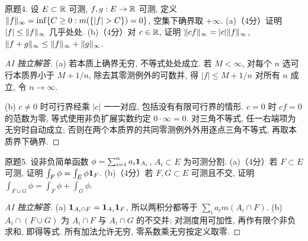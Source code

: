 \begin{exercise}\label{midterm:4}
原题4. 设 $E\subset\mathbb R$ 可测, $f,g:E\to\mathbb R$ 可测, 定义 $\norm f_\infty=\inf\{C\ge0:m(\{|f|>C\})=0\}$, 空集下确界取 $+\infty$. (a)（4分）证明 $|f|\le\lVert f\rVert_\infty$ 几乎处处. (b)（4分）对 $c\in\mathbb R$, 证明 $\lVert cf\rVert_\infty=|c|\lVert f\rVert_\infty$, $\lVert f+g\rVert_\infty\le\lVert f\rVert_\infty+\lVert g\rVert_\infty$.
\end{exercise}
\begin{proof}[AI 独立解答]
(a) 若本质上确界无穷, 不等式处处成立. 若 $M<\infty$, 对每个 $n$ 选可行本质界小于 $M+1/n$, 除去其零测例外的可数并, 得 $|f|\le M+1/n$ 对所有 $n$ 成立, 令 $n\to\infty$.

(b) $c\ne0$ 时可行界经乘 $|c|$ 一一对应, 包括没有有限可行界的情形. $c=0$ 时 $cf=0$ 的范数为零, 等式使用非负扩展实数约定 $0\cdot\infty=0$. 对三角不等式, 任一右端项为无穷时自动成立; 否则在两个本质界的共同零测例外外用逐点三角不等式, 再取本质界下确界.
\end{proof}
\begin{exercise}\label{midterm:5}
原题5. 设非负简单函数 $\phi=\sum_{i=1}^n a_i\mathbf 1_{A_i}$, $A_i\subset E$ 为可测分割. (a)（4分）若 $F\subset E$ 可测, 证明 $\int_F\phi=\int_E\phi\mathbf 1_F$. (b)（4分）若 $F,G\subset E$ 可测且不交, 证明 $\int_{F\cup G}\phi=\int_F\phi+\int_G\phi$.
\end{exercise}
\begin{proof}[AI 独立解答]
(a) $\mathbf 1_{A_i\cap F}=\mathbf 1_{A_i}\mathbf 1_F$, 所以两积分都等于 $\sum_i a_i m(A_i\cap F)$. (b) $A_i\cap(F\cup G)$ 为 $A_i\cap F$ 与 $A_i\cap G$ 的不交并; 对测度用可加性, 再作有限个非负求和, 即得等式. 所有加法允许无穷, 零系数乘无穷按定义取零.
\end{proof}
